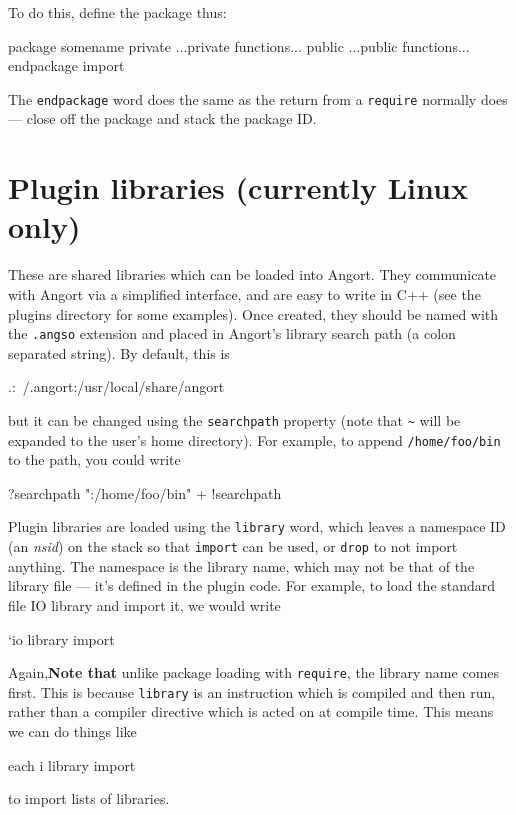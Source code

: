 To do this, define the package thus:
\begin{v}
package somename
private
...private functions...
public
...public functions...
endpackage import
\end{v}
The \texttt{endpackage} word does the same as the return from a 
\texttt{require} normally does --- close off the package and
stack the package ID.

\section{Plugin libraries (currently Linux only)}
\label{library}
These are shared libraries which can be loaded into Angort. They communicate
with Angort via a simplified interface, and are easy to write in C++ (see
the plugins directory for some examples). 
Once created, they should be named with the \texttt{.angso} extension
and placed in Angort's library search path (a colon separated string).
By default, this is 
\begin{v}
.:~/.angort:/usr/local/share/angort
\end{v}
but it can be changed using the 
\texttt{searchpath} property (note that \verb+~+ will be expanded
to the user's home directory). For example, to append \texttt{/home/foo/bin}
to the path, you could write
\begin{v}
?searchpath ":/home/foo/bin" + !searchpath
\end{v}
Plugin libraries are loaded using the \texttt{library} word, which
leaves a namespace ID (an \emph{nsid}) on the stack so that \texttt{import} can be
used, or \texttt{drop} to not import anything. The namespace is
the library name, which may not be that of the library file --- it's defined
in the plugin code. For example, to load the standard file IO library
and import it, we would write
\begin{v}
`io library import
\end{v}
Again,\textbf{Note that} unlike package loading with \texttt{require},
the library name comes first.
This is because \texttt{library} is an instruction which is compiled and
then run, rather than a compiler directive which is acted on
at compile time. This means we can do things like
\begin{v}
[`id3, `mpc, `io] each {i library import}
\end{v}
to import lists of libraries.

